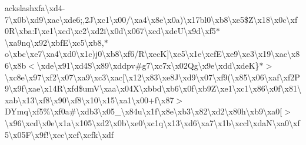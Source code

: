 ackslash{}xfa\textbackslash{}xd4-\/7\textbackslash{}x0b\textbackslash{}xd9\textbackslash{}xac\textbackslash{}xde6;,2\+J\textbackslash{}xc1\textbackslash{}x00/\textbackslash{}xa4\textbackslash{}x8e\textbackslash{}x0a)\textbackslash{}x17bl0\textbackslash{}xb8\textbackslash{}xe5\$\+Z\textbackslash{}x18\textbackslash{}x0c\textbackslash{}xf0\+R\textbackslash{}xba\+:\+I\textbackslash{}xe1\textbackslash{}xcd\textbackslash{}xc2\textbackslash{}xd2i\textbackslash{}x0d\textbackslash{}x067\textbackslash{}xcd\textbackslash{}xde\+U\textbackslash{}x9d\textbackslash{}xf5$\ast$\textbackslash{}xa9nq\textbackslash{}x92\textbackslash{}xbf\+E\textbackslash{}xc5\textbackslash{}xb8,$\ast$o\textbackslash{}xbc\textbackslash{}xe7\textbackslash{}xa4\textbackslash{}xd0\textbackslash{}x1c)j0\textbackslash{}xb8\textbackslash{}xf6/\+R\textbackslash{}xec\+K\mbox{]}\textbackslash{}xe5\textbackslash{}x1e\textbackslash{}xcf\+E\textbackslash{}xe9\textbackslash{}xe3\textbackslash{}x19\textbackslash{}xac\textbackslash{}x86\textbackslash{}x8b$<$\textbackslash{}xde\textbackslash{}x91\textbackslash{}xd4\+S\textbackslash{}x89\textbackslash{}xddpv\#g7\textquotesingle{}\textbackslash{}xc7x\textbackslash{}x02\+Qg\textbackslash{}x9e\textbackslash{}xdd\textbackslash{}xde\+K\}$\ast$$>$\textbackslash{}xc8e\textbackslash{}x97\textbackslash{}xf2\textbackslash{}x07\textbackslash{}xa9\textbackslash{}xc3\textbackslash{}xac\mbox{[}\textbackslash{}x12\textbackslash{}x83\textbackslash{}xe8\+J\textbackslash{}xd9\textbackslash{}x07\textbackslash{}xf9(\textbackslash{}x85\textbackslash{}x06\textbackslash{}xaf\textbackslash{}xf2\+P9\textbackslash{}x9f\textbackslash{}xae\textbackslash{}x14\+R\textbackslash{}xfd\$um\+V\textbackslash{}xaa\textbackslash{}x04\+X\textbackslash{}xbbd\textbackslash{}xb6\textbackslash{}x0f\textbackslash{}xb9\+Z\textbackslash{}xe1\textbackslash{}xc1\textbackslash{}x86\textbackslash{}x0f\textbackslash{}x81\textbackslash{}xab\textbackslash{}x13\textbackslash{}xf8\textbackslash{}x90\textbackslash{}xf8\textbackslash{}x10\textbackslash{}x15\textbackslash{}xa1\textbackslash{}x00+f\textbackslash{}x87$>$\+D\+Ymq\textbackslash{}xf5\%\textbackslash{}xf0a\#\textbackslash{}xdb3\textbackslash{}x05\+\_\+\textbackslash{}x84u\textbackslash{}x1f\textbackslash{}x8e\textbackslash{}xb3\textbackslash{}x82\textbackslash{}xd2\textbackslash{}x80h\textbackslash{}xb9\textbackslash{}xa0\mbox{[}$>$\textbackslash{}x96\textbackslash{}xcd\textbackslash{}x0e\textbackslash{}x1a\textbackslash{}x105\textbackslash{}xd2\textbackslash{}x0b\textbackslash{}xe0\textbackslash{}xc1q\textbackslash{}x13\textbackslash{}xd6\textbackslash{}xa7\textbackslash{}x1b\textbackslash{}xccl\textbackslash{}xda\+N\textbackslash{}xa0\textbackslash{}xf5\textbackslash{}x05\+F\textbackslash{}x9f!\textbackslash{}xcc\textbackslash{}xcf\textbackslash{}xcfk\textbackslash{}xdf 